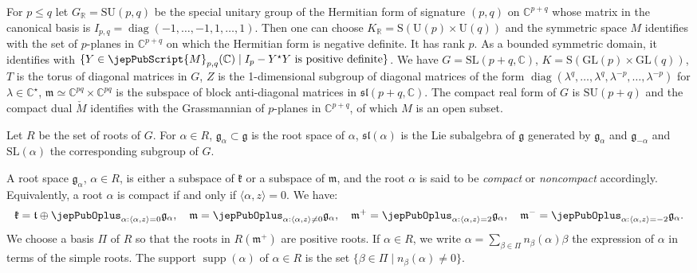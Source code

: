 \begin{example}
For $p\leqslant q$ let $G_{\mathbb R}=\mathrm{SU}(p,q)$ be the special unitary group of the Hermitian form of signature $(p,q)$ on $\mathbb C^{p+q}$ whose matrix in the canonical basis is $I_{p,q}=\operatorname{diag}(-1,\ldots,-1,1,\ldots,1)$. Then one can choose $K_{\mathbb R}=\mathrm S(\mathrm U(p)\times\mathrm U(q))$ and the symmetric space $M$ identifies with the set of $p$-planes in $\mathbb C^{p+q}$ on which the Hermitian form is negative definite. It has rank $p$. As a bounded symmetric domain, it identifies with $\{Y\in \jepPubScript{M}_{p,q}(\mathbb C)\mid I_p-Y^{\star}Y\text{ is positive definite}\}$. We have $G=\mathrm{SL}(p+q,\mathbb C)$, $K=\mathrm S(\mathrm{GL}(p)\times\mathrm{GL}(q))$, $T$ is the torus of diagonal matrices in $G$, $Z$ is the 1-dimensional subgroup of diagonal matrices of the form $\operatorname{diag}(\lambda^q,\ldots,\lambda^q,\lambda^{-p},\ldots,\lambda^{-p})$ for $\lambda\in\mathbb C^{\star}$, $\mathfrak m\simeq\mathbb C^{pq}\times\mathbb C^{pq}$ is the subspace of block anti-diagonal matrices in $\mathfrak{sl}(p+q,\mathbb C)$. The compact real form of $G$ is $\mathrm{SU}(p+q)$ and the compact dual $\check M$ identifies with the Grassmannian of $p$-planes in $\mathbb C^{p+q}$, of which $M$ is an open subset.
\end{example}

Let $R$ be the set of roots of $G$. For $\alpha\in R$, $\mathfrak g_\alpha\subset\mathfrak g$ is the root space of $\alpha$, $\mathfrak{sl}(\alpha)$ is the Lie subalgebra of $\mathfrak g$ generated by $\mathfrak g_\alpha$ and $\mathfrak g_{-\alpha}$ and $\mathrm{SL}(\alpha)$ the corresponding subgroup of $G$.

A root space $\mathfrak g_\alpha$, $\alpha\in R$, is either a subspace of $\mathfrak k$ or a subspace of $\mathfrak m$, and the root $\alpha$ is said to be \emph{compact} or \emph{noncompact} accordingly. Equivalently, a root $\alpha$ is compact if and only if $\langle\alpha,z\rangle=0$. We have:
\[
\mathfrak k=\mathfrak t\oplus\jepPubOplus_{\alpha:\langle\alpha,z\rangle=0}\mathfrak g_\alpha,\quad
\mathfrak m=\jepPubOplus_{\alpha:\langle\alpha,z\rangle\neq0}\mathfrak g_\alpha,\quad
\mathfrak m^+=\jepPubOplus_{\alpha:\langle\alpha,z\rangle=2}\mathfrak g_\alpha,\quad
\mathfrak m^-=\jepPubOplus_{\alpha:\langle\alpha,z\rangle=-2}\mathfrak g_\alpha.
\]
We choose a basis $\Pi$ of $R$ so that the roots in $R(\mathfrak m^+)$ are positive roots. If $\alpha\in R$, we write $\alpha=\sum_{\beta\in\Pi}n_\beta(\alpha)\beta$ the expression of $\alpha$ in terms of the simple roots. The support $\operatorname{supp}(\alpha)$ of $\alpha\in R$ is the set $\{\beta\in\Pi\mid n_\beta(\alpha)\neq0\}$.

